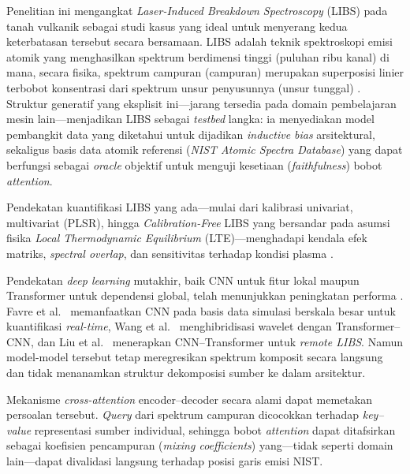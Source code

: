 Penelitian ini mengangkat \textit{Laser-Induced Breakdown Spectroscopy} (LIBS) pada tanah vulkanik sebagai studi kasus yang ideal untuk menyerang kedua keterbatasan tersebut secara bersamaan. LIBS adalah teknik spektroskopi emisi atomik yang menghasilkan spektrum berdimensi tinggi (puluhan ribu kanal) di mana, secara fisika, spektrum campuran (campuran) merupakan superposisi linier terbobot konsentrasi dari spektrum unsur penyusunnya (unsur tunggal) \citep{legnaioli_laser-induced_2025, sawyers_database_2025}. Struktur generatif yang eksplisit ini---jarang tersedia pada domain pembelajaran mesin lain---menjadikan LIBS sebagai \textit{testbed} langka: ia menyediakan model pembangkit data yang diketahui untuk dijadikan \textit{inductive bias} arsitektural, sekaligus basis data atomik referensi (\textit{NIST Atomic Spectra Database}) yang dapat berfungsi sebagai \textit{oracle} objektif untuk menguji kesetiaan (\textit{faithfulness}) bobot \textit{attention}.

Pendekatan kuantifikasi LIBS yang ada---mulai dari kalibrasi univariat, multivariat (PLSR), hingga \textit{Calibration-Free} LIBS yang bersandar pada asumsi fisika \textit{Local Thermodynamic Equilibrium} (LTE)---menghadapi kendala efek matriks, \textit{spectral overlap}, dan sensitivitas terhadap kondisi plasma \citep{zhang_improving_2025, hao_machine_2024, cristoforetti_local_2010}.

Pendekatan \textit{deep learning} mutakhir, baik CNN untuk fitur lokal maupun Transformer untuk dependensi global, telah menunjukkan peningkatan performa \citep{liu_remote_2026}. Favre et al.\ \citep{favre_towards_2025} memanfaatkan CNN pada basis data simulasi berskala besar untuk kuantifikasi \textit{real-time}, Wang et al.\ \citep{wang_simulation_2024} menghibridisasi wavelet dengan Transformer--CNN, dan Liu et al.\ \citep{liu_remote_2026} menerapkan CNN--Transformer untuk \textit{remote LIBS}. Namun model-model tersebut tetap meregresikan spektrum komposit secara langsung dan tidak menanamkan struktur dekomposisi sumber ke dalam arsitektur.

Mekanisme \textit{cross-attention} encoder--decoder \citep{vaswani_attention_2017} secara alami dapat memetakan persoalan tersebut. \textit{Query} dari spektrum campuran dicocokkan terhadap \textit{key--value} representasi sumber individual, sehingga bobot \textit{attention} dapat ditafsirkan sebagai koefisien pencampuran (\textit{mixing coefficients}) yang---tidak seperti domain lain---dapat divalidasi langsung terhadap posisi garis emisi NIST.

